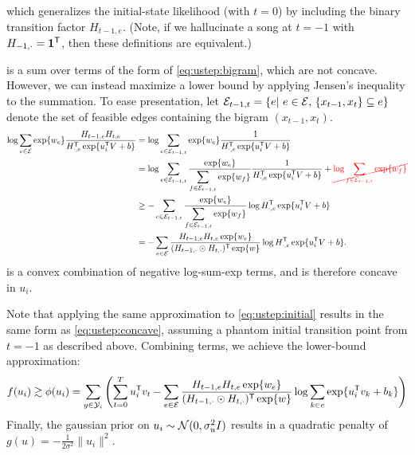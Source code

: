 \documentclass{article}
\newcommand{\ccancel}[2][black]{\color{#1}\cancel{#2}\normalcolor}
\def\E{\ensuremath{\mathcal{E}}}
\begin{document}
which generalizes the initial-state likelihood (with $t=0$) by including the binary transition factor $H_{t-1,e}$.  
(Note, if we hallucinate a song at $t=-1$ with $H_{-1,\cdot} = \mathbf{1}^\mathsf{T}$, then these definitions are equivalent.)

 is a sum over terms of the form of \cref{eq:ustep:bigram}, which are not concave.  However, we can instead maximize a lower bound by applying Jensen's inequality to
the summation.  To ease presentation, let ${\E_{t-1,t} = \{e \given e \in \E,\, \{x_{t-1}, x_{t}\} \subseteq e\}}$ denote the set of feasible edges containing the bigram $(x_{t-1}, x_t)$.
\begin{align}
\log\sum_{e\in \E} \exp\{w_e\} \frac{H_{t-1,e} H_{t, e} }{H_{\cdot,e}\trans \exp\{u_i\trans V + b \} }
&= \log\sum_{e \in \E_{t-1,t}} \exp\{w_e\} \frac{1}{H_{\cdot, e}\trans \exp\{u_i\trans V + b\} }\notag\\
&= \log\sum_{e \in \E_{t-1,t}} \frac{\exp\{w_e\}}{\displaystyle\sum_{f\in\E_{t-1,t}} \exp\{w_f\}} \frac{1}{H_{\cdot, e}\trans \exp\{u_i\trans V + b\} } + \ccancel[red]{\log \sum_{f \in \E_{t-1,t}} \exp\{w_f\}}\notag\\
&\geq -\sum_{e \in \E_{t-1,t}} \frac{\exp\{w_e\}}{\displaystyle\sum_{f\in\E_{t-1,t}} \exp\{w_f\}} \log H_{\cdot, e}\trans \exp\{u_i\trans V + b\}  \notag\\
&= -\sum_{e\in\E} \frac{H_{t-1,e} H_{t,e} \exp\{w_e\}}{ (H_{t-1,\cdot} \odot H_{t,\cdot})\trans \exp\{w\}} \log H_{\cdot, e}\trans \exp\{u_i\trans V + b\}  \label{eq:ustep:concave}.
\end{align}
 is a convex combination of negative log-sum-exp terms, and is therefore concave in $u_i$.  

Note that applying the same approximation to \cref{eq:ustep:initial} results in the same form as \cref{eq:ustep:concave}, assuming a phantom initial transition point from $t=-1$ 
as described above.  Combining terms, we achieve the lower-bound approximation:
\begin{equation}
f(u_i) \gtrsim \phi(u_i) = \sum_{y \in \Y_i} \left(\sum_{t=0}^T u_i\trans v_t - \sum_{e \in \E} \frac{H_{t-1,e} H_{t,e} \exp\{w_e\}}{ (H_{t-1,\cdot}\odot H_{t,\cdot})\trans \exp\{w\}} \log
\sum_{k\in e} \exp\{u_i\trans v_k + b_k\} \right)\label{eq:ustep:concave_obj}
\end{equation}
Finally, the gaussian prior on $u_i \sim \mathcal{N}(0, \sigma_u^2 I)$ results in a quadratic penalty of $g(u) = -\frac{1}{2\sigma^2}\|u_i\|^2$.
\end{document}
